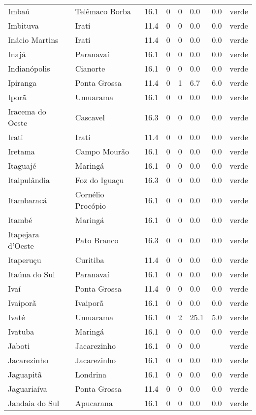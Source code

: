 \begin{longtable}{l|lllllll}
  Imbaú & Telêmaco Borba & 16.1 & 0 & 0 & 0.0 & 0.0 & verde \\ 
  Imbituva & Iratí & 11.4 & 0 & 0 & 0.0 & 0.0 & verde \\ 
  Inácio Martins & Iratí & 11.4 & 0 & 0 & 0.0 & 0.0 & verde \\ 
  Inajá & Paranavaí & 16.1 & 0 & 0 & 0.0 & 0.0 & verde \\ 
  Indianópolis & Cianorte & 16.1 & 0 & 0 & 0.0 & 0.0 & verde \\ 
  Ipiranga & Ponta Grossa & 11.4 & 0 & 1 & 6.7 & 6.0 & verde \\ 
  Iporã & Umuarama & 16.1 & 0 & 0 & 0.0 & 0.0 & verde \\ 
  Iracema do Oeste & Cascavel & 16.3 & 0 & 0 & 0.0 & 0.0 & verde \\ 
  Irati & Iratí & 11.4 & 0 & 0 & 0.0 & 0.0 & verde \\ 
  Iretama & Campo Mourão & 16.1 & 0 & 0 & 0.0 & 0.0 & verde \\ 
  Itaguajé & Maringá & 16.1 & 0 & 0 & 0.0 & 0.0 & verde \\ 
  Itaipulândia & Foz do Iguaçu & 16.3 & 0 & 0 & 0.0 & 0.0 & verde \\ 
  Itambaracá & Cornélio Procópio & 16.1 & 0 & 0 & 0.0 & 0.0 & verde \\ 
  Itambé & Maringá & 16.1 & 0 & 0 & 0.0 & 0.0 & verde \\ 
  Itapejara d'Oeste & Pato Branco & 16.3 & 0 & 0 & 0.0 & 0.0 & verde \\ 
  Itaperuçu & Curitiba & 11.4 & 0 & 0 & 0.0 & 0.0 & verde \\ 
  Itaúna do Sul & Paranavaí & 16.1 & 0 & 0 & 0.0 & 0.0 & verde \\ 
  Ivaí & Ponta Grossa & 11.4 & 0 & 0 & 0.0 & 0.0 & verde \\ 
  Ivaiporã & Ivaiporã & 16.1 & 0 & 0 & 0.0 & 0.0 & verde \\ 
  Ivaté & Umuarama & 16.1 & 0 & 2 & 25.1 & 5.0 & verde \\ 
  Ivatuba & Maringá & 16.1 & 0 & 0 & 0.0 & 0.0 & verde \\ 
  Jaboti & Jacarezinho & 16.1 & 0 & 0 & 0.0 &  & verde \\ 
  Jacarezinho & Jacarezinho & 16.1 & 0 & 0 & 0.0 & 0.0 & verde \\ 
  Jaguapitã & Londrina & 16.1 & 0 & 0 & 0.0 & 0.0 & verde \\ 
  Jaguariaíva & Ponta Grossa & 11.4 & 0 & 0 & 0.0 & 0.0 & verde \\ 
  Jandaia do Sul & Apucarana & 16.1 & 0 & 0 & 0.0 & 0.0 & verde \\ 

\end{longtable}
